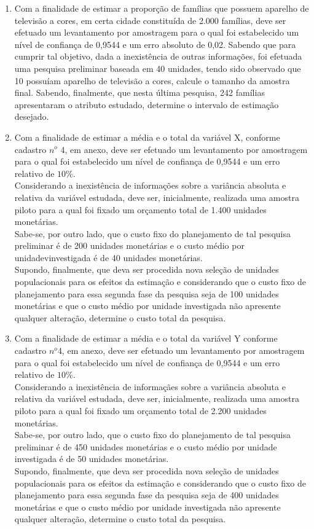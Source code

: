\begin{enumerate}[resume]
\item Com a finalidade de estimar a proporção de famílias que possuem aparelho de televisão a cores, em certa cidade constituída de 2.000 famílias, deve ser efetuado um levantamento por amostragem para o qual foi estabelecido um nível de confiança de 0,9544 e um erro absoluto de 0,02. Sabendo que para cumprir tal objetivo, dada a inexistência de outras informações, foi efetuada uma pesquisa preliminar baseada em 40 unidades, tendo sido observado que 10 possuíam aparelho de televisão a cores, calcule o tamanho da amostra final. Sabendo, finalmente, que nesta última pesquisa, 242 famílias apresentaram o atributo estudado, determine o intervalo de estimação desejado.

\item Com a finalidade de estimar a média e o total da variável X, conforme cadastro $n^o$ 4, em anexo, deve ser efetuado um levantamento por amostragem para o qual foi estabelecido um nível de confiança de 0,9544 e um erro relativo de $10\%$.\\
Considerando a inexistência de informações sobre a variância absoluta e relativa da variável estudada, deve ser, inicialmente, realizada uma amostra piloto para a qual foi fixado um orçamento total de 1.400 unidades monetárias.\\
Sabe-se, por outro lado, que o custo fixo do planejamento de tal pesquisa preliminar é de 200 unidades monetárias e o custo médio por unidadevinvestigada é de 40 unidades monetárias.\\
Supondo, finalmente, que deva ser procedida nova seleção de unidades populacionais para os efeitos da estimação e considerando que o custo fixo de planejamento para essa segunda fase da pesquisa seja de 100 unidades monetárias e que o custo médio por unidade investigada não apresente qualquer alteração, determine o custo total da pesquisa.

\item Com a finalidade de estimar a média e o total da variável Y conforme cadastro $n^o$4, em anexo, deve ser efetuado um levantamento por amostragem para o qual foi estabelecido um nível de confiança de 0,9544 e um erro relativo de $10\%$.\\
Considerando a inexistência de informaçães sobre a variância absoluta e relativa da variável estudada, deve ser, inicialmente, realizada uma amostra piloto para a qual foi fixado um orçamento total de 2.200 unidades monetárias.\\
Sabe-se, por outro lado, que o custo fixo do planejamento de tal pesquisa preliminar é de 450 unidades monetárias e o custo médio por unidade investigada é de 50 unidades monetárias.\\
Supondo, finalmente, que deva ser procedida nova seleção de unidades populacionais para os efeitos da estimação e considerando que o custo fixo de planejamento para essa segunda fase da pesquisa seja de 400 unidades monetárias e que o custo médio por unidade investigada não apresente qualquer alteração, determine o custo total da pesquisa.


\end{enumerate}
